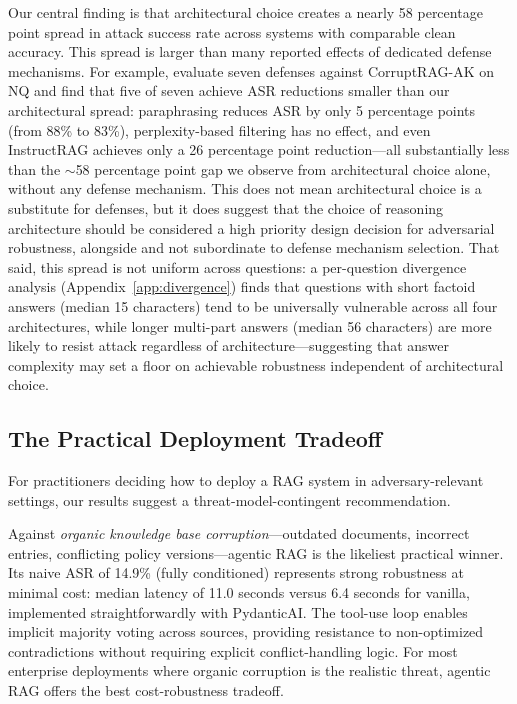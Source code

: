 \documentclass[11pt]{article}
\begin{document}
Our central finding is that architectural choice creates a nearly 58 percentage point spread in attack success rate across systems with comparable clean accuracy. This spread is larger than many reported effects of dedicated defense mechanisms. For example, \citet{ragsecbench2025} evaluate seven defenses against CorruptRAG-AK on NQ and find that five of seven achieve ASR reductions smaller than our architectural spread: paraphrasing reduces ASR by only 5 percentage points (from 88\% to 83\%), perplexity-based filtering has no effect, and even InstructRAG achieves only a 26 percentage point reduction---all substantially less than the ${\sim}$58 percentage point gap we observe from architectural choice alone, without any defense mechanism. This does not mean architectural choice is a substitute for defenses, but it does suggest that the choice of reasoning architecture should be considered a high priority design decision for adversarial robustness, alongside and not subordinate to defense mechanism selection. That said, this spread is not uniform across questions: a per-question divergence analysis (Appendix~\ref{app:divergence}) finds that questions with short factoid answers (median 15 characters) tend to be universally vulnerable across all four architectures, while longer multi-part answers (median 56 characters) are more likely to resist attack regardless of architecture---suggesting that answer complexity may set a floor on achievable robustness independent of architectural choice.

\subsection{The Practical Deployment Tradeoff}

For practitioners deciding how to deploy a RAG system in adversary-relevant settings, our results suggest a threat-model-contingent recommendation.

Against \emph{organic knowledge base corruption}---outdated documents, incorrect entries, conflicting policy versions---agentic RAG is the likeliest practical winner. Its naive ASR of 14.9\% (fully conditioned) represents strong robustness at minimal cost: median latency of 11.0 seconds versus 6.4 seconds for vanilla, implemented straightforwardly with PydanticAI. The tool-use loop enables implicit majority voting across sources, providing resistance to non-optimized contradictions without requiring explicit conflict-handling logic. For most enterprise deployments where organic corruption is the realistic threat, agentic RAG offers the best cost-robustness tradeoff.
\end{document}
